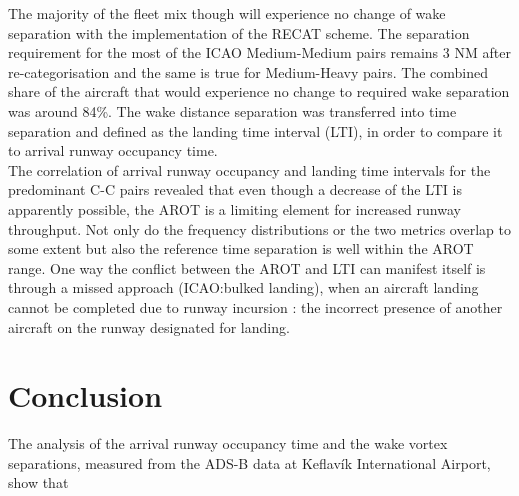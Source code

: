 The majority of the fleet mix though will experience no change of wake separation with the implementation of the RECAT scheme. The separation requirement for the most of the ICAO Medium-Medium pairs remains 3 NM after re-categorisation and the same is true for Medium-Heavy pairs. The combined share of the aircraft that would experience no change to required wake separation was around 84\%. The wake distance separation was transferred into time separation and defined as the landing time interval (LTI), in order to compare it to arrival runway occupancy time.\\
The correlation of arrival runway occupancy and landing time intervals for the predominant C-C pairs revealed that even though a decrease of the LTI is apparently possible, the AROT is a limiting element for increased runway throughput. Not only do the frequency distributions or the two metrics overlap to some extent but also the reference time separation is well within the AROT range. One way the conflict between the AROT and LTI can manifest itself is through a missed approach (ICAO:bulked landing), when an aircraft landing cannot be completed due to runway incursion \cite{doc44444}: the incorrect presence of another aircraft on the runway designated for landing.

\section{Conclusion\label{sec:conclusions}}
The analysis of the  arrival runway occupancy time and the wake vortex separations, measured from the ADS-B data at Keflavík International Airport, show that  




